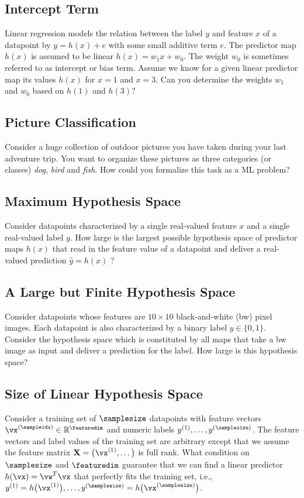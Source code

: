 \documentclass[12pt]{report}
\newcommand{\featurelen}{\featuredim}
\begin{document}
 \subsection{Intercept Term}
 \label{ex_2_5}
 Linear regression models the relation between the label $y$ and feature $x$ of 
 a datapoint by $y = h(x) + e$ with some small additive term $e$. The predictor 
 map $h(x)$ is assumed to be linear $h(x) =w_1 x + w_0$. The weight $w_{0}$ is 
 sometimes referred to as intercept or bias term. Assume we know for a given 
 linear predictor map its values $h(x)$ for $x=1$ and $x=3$. Can you determine 
 the weights $w_{1}$ and $w_{0}$ based on $h(1)$ and $h(3)$?
 
 \subsection{Picture Classification} 
 \label{ex_2_6}
Consider a huge collection of outdoor pictures 
you have taken during your last adventure 
trip. You want to organize these pictures as 
three categories (or classes) \emph{dog}, 
\emph{bird} and \emph{fish}. How could you  
formalize this task as a ML problem? 

 \subsection{Maximum Hypothesis Space} 
\label{ex_2_7}
Consider datapoints characterized by a single real-valued 
feature $x$ and a single real-valued label $y$. How large 
is the largest possible hypothesis space of predictor maps 
$h(x)$ that read in the feature value of a datapoint and 
deliver a real-valued prediction $\hat{y}=h(x)$ ? 

 \subsection{A Large but Finite Hypothesis Space} 
\label{ex_2_8}
Consider datapoints whose features are $10 \times 10$ 
black-and-white (bw) pixel images. Each datapoint is also 
characterized by a binary label $y \in \{0,1\}$. Consider the 
hypothesis space which is constituted by all maps that take 
a bw image as input and deliver a prediction for the label. 
How large is this hypothesis space? 

\subsection{Size of Linear Hypothesis Space} 
\label{ex_size_lin_hypospace} 
Consider a training set of $\samplesize$ datapoints with feature 
vectors $\vx^{(\sampleidx)} \in \mathbb{R}^{\featuredim}$ and 
numeric labels $y^{(1)},\ldots,y^{(\samplesize)}$. The feature vectors 
and label values of the training set are arbitrary except that we assume 
the feature matrix $\mathbf{X} = \big(\vx^{(1)},\ldots \big)$ is full rank. 
What condition on $\samplesize$ and $\featurelen$ guarantee that we 
can find a linear predictor $h(\vx) = \vw^{T} \vx$ that perfectly fits the 
training set, i.e., $y^{(1)} = h\big(\vx^{(1)} \big),\ldots, y^{(\samplesize)} = h\big(\vx^{(\samplesize)} \big)$. 
\end{document}
